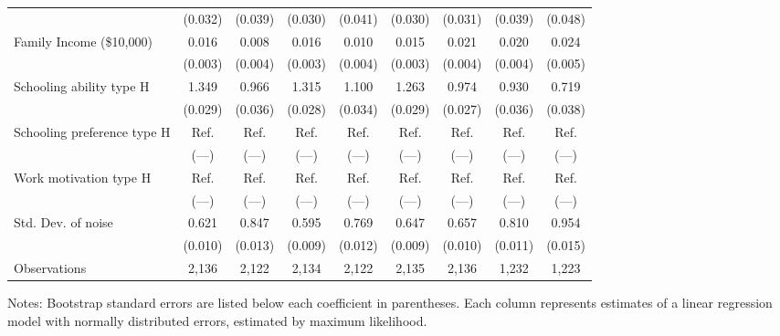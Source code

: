 \begin{table}[ht]
{\begin{threeparttable}
\begin{tabular}{lcccccccc}
 & (0.032) & (0.039) & (0.030) & (0.041) & (0.030) & (0.031) & (0.039) & (0.048) \\ 
Family Income (\$10,000) & 0.016 & 0.008 & 0.016 & 0.010 & 0.015 & 0.021 & 0.020 & 0.024 \\ 
 & (0.003) & (0.004) & (0.003) & (0.004) & (0.003) & (0.004) & (0.004) & (0.005) \\ 
Schooling ability type H & 1.349 & 0.966 & 1.315 & 1.100 & 1.263 & 0.974 & 0.930 & 0.719 \\ 
 & (0.029) & (0.036) & (0.028) & (0.034) & (0.029) & (0.027) & (0.036) & (0.038) \\ 
Schooling preference type H & Ref. & Ref. & Ref. & Ref. & Ref. & Ref. & Ref. & Ref. \\ 
 & (---) & (---) & (---) & (---) & (---) & (---) & (---) & (---) \\ 
Work motivation type H & Ref. & Ref. & Ref. & Ref. & Ref. & Ref. & Ref. & Ref. \\ 
 & (---) & (---) & (---) & (---) & (---) & (---) & (---) & (---) \\ 
Std. Dev. of noise & 0.621 & 0.847 & 0.595 & 0.769 & 0.647 & 0.657 & 0.810 & 0.954 \\ 
 & (0.010) & (0.013) & (0.009) & (0.012) & (0.009) & (0.010) & (0.011) & (0.015) \\ 
\midrule
Observations & 2,136 & 2,122 & 2,134 & 2,122 & 2,135 & 2,136 & 1,232 & 1,223 \\ 
\bottomrule
\end{tabular}
\footnotesize Notes: Bootstrap standard errors are listed below each coefficient in parentheses. Each column represents estimates of a linear regression model with normally distributed errors, estimated by maximum likelihood.
\end{threeparttable}
}
\end{table}
